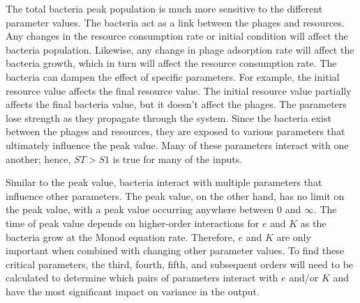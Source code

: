 The total bacteria peak population is much more sensitive to the different parameter values. 
The bacteria act as a link between the phages and resources. 
Any changes in the resource consumption rate or initial condition will affect the bacteria population. 
Likewise, any change in phage adsorption rate will affect the bacteria growth, which in turn will affect the resource consumption rate. 
The bacteria can dampen the effect of specific parameters. 
For example, the initial resource value affects the final resource value. 
The initial resource value partially affects the final bacteria value, but it doesn't affect the phages. 
The parameters lose strength as they propagate through the system. 
Since the bacteria exist between the phages and resources, they are exposed to various parameters that ultimately influence the peak value. 
Many of these parameters interact with one another; hence, $ST > S1$ is true for many of the inputs. 

Similar to the peak value, bacteria interact with multiple parameters that influence other parameters. 
The peak value, on the other hand, has no limit on the peak value, with a peak value occurring anywhere between 0 and $\infty$. 
The time of peak value depends on higher-order interactions for $e$ and $K$ as the bacteria grow at the Monod equation rate. Therefore, $e$ and $K$ are only important when combined with changing other parameter values. 
To find these critical parameters, the third, fourth, fifth, and subsequent orders will need to be calculated to determine which pairs of parameters interact with $e$ and/or $K$ and have the most significant impact on variance in the output. 

